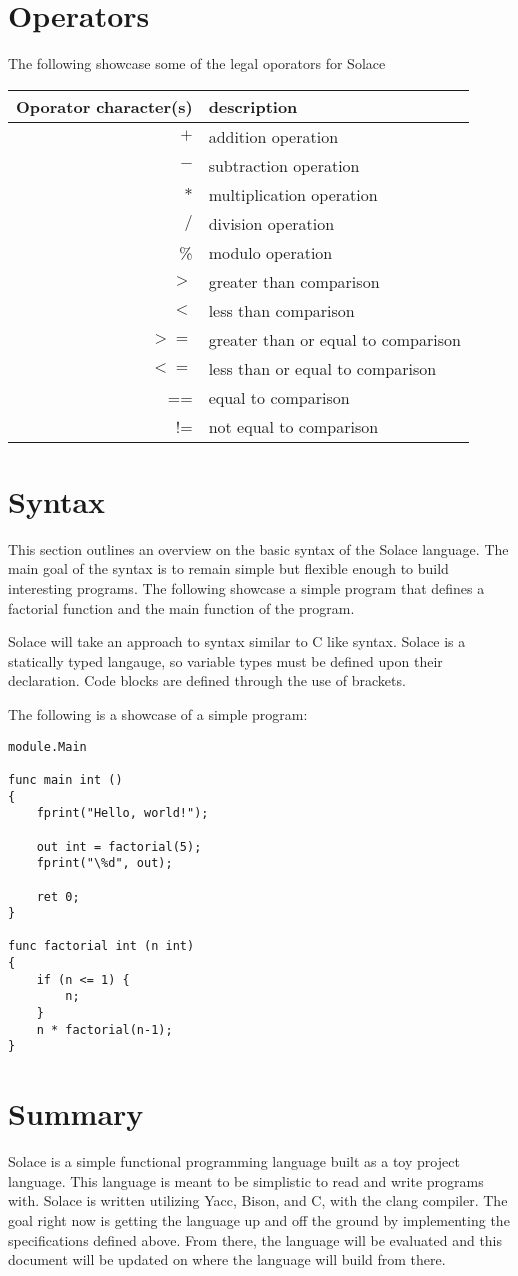 \documentclass{article}
\begin{document}
\section{Operators}
The following showcase some of the legal oporators for Solace

\begin{tabular}{r|l}
Oporator character(s) & description \\
\hline
\hline
$+$ & addition operation \\
$-$ & subtraction operation \\
$*$ & multiplication operation \\
$/$ & division operation \\
\% & modulo operation \\
$>$ & greater than comparison \\
$<$ & less than comparison \\
$>=$ & greater than or equal to comparison \\
$<=$ & less than or equal to comparison \\
== & equal to comparison \\
!= & not equal to comparison \\
\hline
\end{tabular}


\section{Syntax}
This section outlines an overview on the basic syntax of the Solace language.
The main goal of the syntax is to remain simple but flexible enough to build
interesting programs. The following showcase a simple program that defines a 
factorial function and the main function of the program.

Solace will take an approach to syntax similar to C like syntax. Solace is a statically typed
langauge, so variable types must be defined upon their declaration. Code blocks are defined
through the use of brackets.

The following is a showcase of a simple program:
\begin{lstlisting}
module.Main

func main int ()
{
	fprint("Hello, world!");
	
	out int = factorial(5);
	fprint("\%d", out);
	
	ret 0;
}

func factorial int (n int)
{
	if (n <= 1) {
		n;
	}
	n * factorial(n-1);
}
\end{lstlisting}


\section{Summary}
Solace is a simple functional programming language built as a toy project language.
This language is meant to be simplistic to read and write programs with. Solace is written 
utilizing Yacc, Bison, and C, with the clang compiler.
The goal right now is getting the language up and off the ground by implementing the
specifications defined above. From there, the language will be evaluated and this document
will be updated on where the language will build from there.
\end{document}
